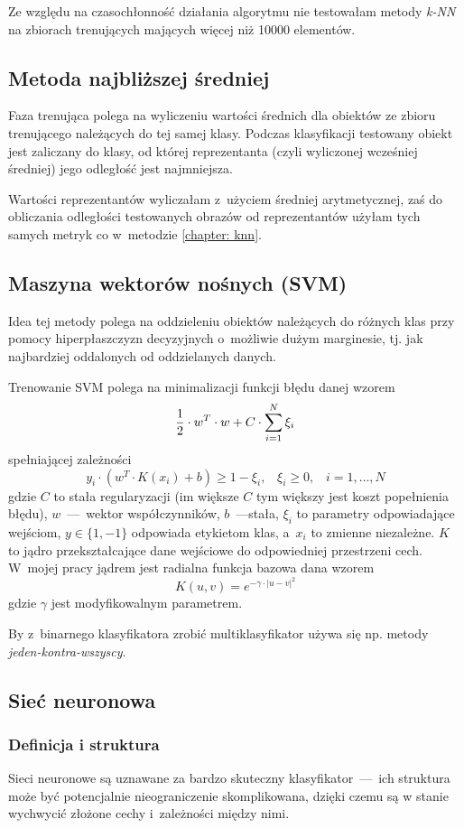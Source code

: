 \documentclass[12pt]{article}
\begin{document}
Ze względu na czasochłonność działania algorytmu nie testowałam metody \emph{k-NN} na zbiorach trenujących mających więcej niż 10000 elementów.
\subsection{Metoda najbliższej średniej}
Faza trenująca polega na wyliczeniu wartości średnich dla obiektów ze zbioru trenującego należących do tej samej klasy. Podczas klasyfikacji testowany obiekt jest zaliczany do klasy, od której reprezentanta (czyli wyliczonej wcześniej średniej)
jego odległość jest najmniejsza.

Wartości reprezentantów wyliczałam z~użyciem średniej arytmetycznej, zaś do obliczania odległości testowanych obrazów od reprezentantów użyłam tych samych metryk co w~metodzie \ref{chapter: knn}.
\subsection{Maszyna wektorów nośnych (SVM)}\label{chapter:svm - opis}
Idea tej metody polega na oddzieleniu obiektów należących do różnych klas przy pomocy hiperpłaszczyzn decyzyjnych o~możliwie dużym marginesie, tj. jak najbardziej oddalonych od oddzielanych danych.

Trenowanie SVM polega na minimalizacji funkcji błędu danej wzorem
\[
 {1 \over 2} \cdot w^T \cdot w + C \cdot \sum_{i=1}^{N}\xi_i
\]
spełniającej zależności
\[
 y_i \cdot(w^T \cdot K(x_i) + b) \ge 1 - \xi_i,\;\;\; \xi_i \ge 0,\;\;\; i = 1, \dots, N 
\]
gdzie $C$ to stała regularyzacji (im większe $C$ tym większy jest koszt popełnienia błędu), $w$~---~wektor współczynników, $b$~---stała, $\xi_i$ to parametry 
odpowiadające wejściom, $y \in \{1,-1\}$ odpowiada etykietom klas, a~$x_i$ to zmienne niezależne.
$K$ to jądro przekształcające dane wejściowe do odpowiedniej przestrzeni cech. W~mojej pracy jądrem jest radialna funkcja bazowa dana wzorem
\[
 K(u,v) = e^{-\gamma \cdot |u-v|^2}
\]
gdzie $\gamma$ jest modyfikowalnym parametrem.

By z~binarnego klasyfikatora zrobić multiklasyfikator używa się np. metody \emph{jeden-kontra-wszyscy}.

\subsection{Sieć neuronowa}
\subsubsection{Definicja i struktura}
Sieci neuronowe są uznawane za bardzo skuteczny klasyfikator~---~ich struktura może być potencjalnie
nieograniczenie skomplikowana, dzięki czemu są w stanie wychwycić złożone cechy i~zależności między nimi.
\end{document}
